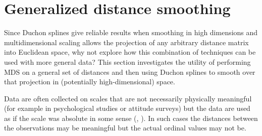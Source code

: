 \section{Generalized distance smoothing}
\label{gds-gds-examples}

Since Duchon splines give reliable results when smoothing in high dimensions and multidimensional scaling allows the projection of any arbitrary distance matrix into Euclidean space, why not explore how this combination of techniques can be used with more general data? This section investigates the utility of performing MDS on a general set of distances and then using Duchon splines to smooth over that projection in (potentially high-dimensional) space.

Data are often collected on scales that are not necessarily physically meaningful (for example in psychological studies or attitude surveys) but the data are used as if the scale was absolute in some sense (\cite{cox2007}, \cite{torgerson}). In such cases the distances between the observations may be meaningful but the actual ordinal values may not be.

